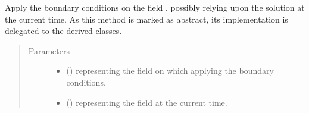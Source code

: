 \documentclass[letterpaper,10pt,english]{sphinxmanual}
\begin{document}
\begin{fulllineitems}
\begin{fulllineitems}
\begin{quote}
\begin{description}
\end{description}\end{quote}

\end{fulllineitems}


\begin{fulllineitems}
\label{\detokenize{api:dycore.horizontal_boundary.HorizontalBoundary.apply}}
Apply the boundary conditions on the field , possibly relying upon the solution
 at the current time.
As this method is marked as abstract, its implementation is delegated to the derived classes.
\begin{quote}\begin{description}
\item[{Parameters}] \leavevmode\begin{itemize}
\item {} 
 () \textendash{}  representing the field on which applying the boundary conditions.

\item {} 
 () \textendash{}  representing the field at the current time.

\end{itemize}

\end{description}\end{quote}

\end{fulllineitems}



\end{fulllineitems}
\end{document}
